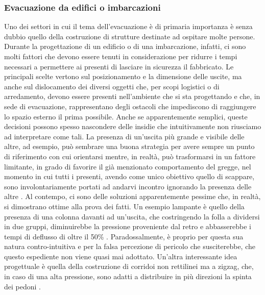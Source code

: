 \subsubsection{Evacuazione da edifici o imbarcazioni}
Uno dei settori in cui il tema dell'evacuazione è di primaria importanza è senza dubbio quello della costruzione di strutture destinate ad ospitare molte persone. Durante la progettazione di un edificio o di una imbarcazione, infatti, ci sono molti fattori che devono essere tenuti in considerazione per ridurre i tempi necessari a permettere ai presenti di lasciare in sicurezza il fabbricato. \newline 
Le principali scelte vertono sul posizionamento e la dimensione delle uscite, ma anche sul dislocamento dei diversi oggetti che, per scopi logistici o di arredamento, devono essere presenti nell'ambiente che si sta progettando e che, in sede di evacuazione, rappresentano degli ostacoli che impediscono di raggiungere lo spazio esterno il prima possibile. \newline
Anche se apparentemente semplici, queste decisioni possono spesso nascondere delle insidie che intuitivamente non riusciamo ad interpretare come tali. \newline 
La presenza di un'uscita più grande e visibile delle altre, ad esempio, può sembrare una buona strategia per avere sempre un punto di riferimento con cui orientarsi mentre, in realtà, può trasformarsi in un fattore limitante, in grado di favorire il già menzionato comportamento del gregge, nel momento in cui tutti i presenti, avendo come unico obiettivo quello di scappare, sono involontariamente portati ad andarvi incontro ignorando la presenza delle altre \cite{Almeida2013}. \newline
Al contempo, ci sono delle soluzioni apparentemente pessime che, in realtà, si dimostrano ottime alla prova dei fatti. Un esempio lampante è quello della presenza di una colonna davanti ad un'uscita, che costringendo la folla a dividersi in due gruppi, diminuirebbe la pressione proveniente dal retro e abbasserebbe i tempi di deflusso di oltre il 50\% \cite{Helbing2002}. Paradossalmente, è proprio per questa sua natura contro-intuitiva e per la falsa percezione di pericolo che susciterebbe, che questo espediente non viene quasi mai adottato. \newline
Un'altra interessante idea progettuale è quella della costruzione di corridoi non rettilinei ma a zigzag, che, in caso di una alta pressione, sono adatti a distribuire in più direzioni la spinta dei pedoni \cite{Helbing2005}.

